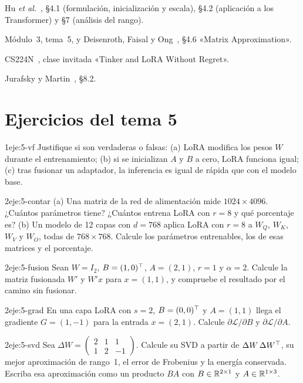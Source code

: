 \begin{lecturas}
\item Hu \emph{et al.}~\cite{hu-lora}, §4.1 (formulación, inicialización y escala), §4.2 (aplicación a los Transformer) y §7 (análisis del rango).
\item Módulo~3, tema~5, y Deisenroth, Faisal y Ong~\cite{mml}, §4.6 «Matrix Approximation».
\item CS224N~\cite{cs224n}, clase invitada «Tinker and LoRA Without Regret».
\item Jurafsky y Martin~\cite{jm3}, §8.2.
\end{lecturas}

\section*{Ejercicios del tema 5}

\begin{ejercicio}{1}{eje:5-vf}
Justifique si son verdaderas o falsas: (a) LoRA modifica los pesos $W$ durante el entrenamiento; (b) si se inicializan $A$ y $B$ a cero, LoRA funciona igual; (c) tras fusionar un adaptador, la inferencia es igual de rápida que con el modelo base.
\end{ejercicio}

\begin{ejercicio}{2}{eje:5-contar}
(a) Una matriz de la red de alimentación mide $1024\times 4096$. ¿Cuántos parámetros tiene? ¿Cuántos entrena LoRA con $r=8$ y qué porcentaje es? (b) Un modelo de 12 capas con $d=768$ aplica LoRA con $r=8$ a $W_Q$, $W_K$, $W_V$ y $W_O$, todas de $768\times 768$. Calcule los parámetros entrenables, los de esas matrices y el porcentaje.
\end{ejercicio}

\begin{ejercicio}{2}{eje:5-fusion}
Sean $W=I_2$, $B=(1,0)^{\top}$, $A=(2,1)$, $r=1$ y $\alpha=2$. Calcule la matriz fusionada $W'$ y $W'x$ para $x=(1,1)$, y compruebe el resultado por el camino sin fusionar.
\end{ejercicio}

\begin{ejercicio}{2}{eje:5-grad}
En una capa LoRA con $s=2$, $B=(0,0)^{\top}$ y $A=(1,1)$ llega el gradiente $G=(1,-1)$ para la entrada $x=(2,1)$. Calcule $\partial\mathcal{L}/\partial B$ y $\partial\mathcal{L}/\partial A$.
\end{ejercicio}

\begin{ejercicio}{2}{eje:5-svd}
Sea $\Delta W=\begin{pmatrix}2&1&1\\1&2&-1\end{pmatrix}$. Calcule su SVD a partir de $\Delta W\,\Delta W^{\top}$, su mejor aproximación de rango~1, el error de Frobenius y la energía conservada. Escriba esa aproximación como un producto $BA$ con $B\in\mathbb{R}^{2\times 1}$ y $A\in\mathbb{R}^{1\times 3}$.
\end{ejercicio}

